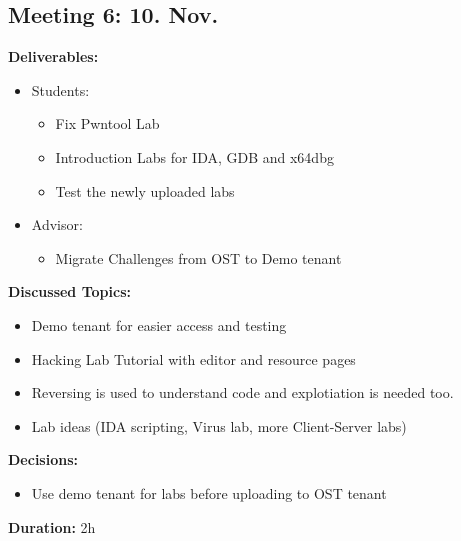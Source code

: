 \newpage
\subsection*{Meeting 6: 10. Nov.}
\textbf{Deliverables:}
\begin{itemize}
    \item Students:
    \begin{itemize}
        \item Fix Pwntool Lab
        \item Introduction Labs for IDA, GDB and x64dbg
        \item Test the newly uploaded labs
    \end{itemize}
    \item Advisor:
    \begin{itemize}
        \item Migrate Challenges from OST to Demo tenant
    \end{itemize}
\end{itemize} 
\textbf{Discussed Topics:}
\begin{itemize}
    \item Demo tenant for easier access and testing
    \item Hacking Lab Tutorial with editor and resource pages
    \item Reversing is used to understand code and explotiation is needed too.
    \item Lab ideas (IDA scripting, Virus lab, more Client-Server labs)
\end{itemize}
\textbf{Decisions:}
\begin{itemize}
    \item Use demo tenant for labs before uploading to OST tenant    
\end{itemize}
\textbf{Duration:} 2h

\newpage
